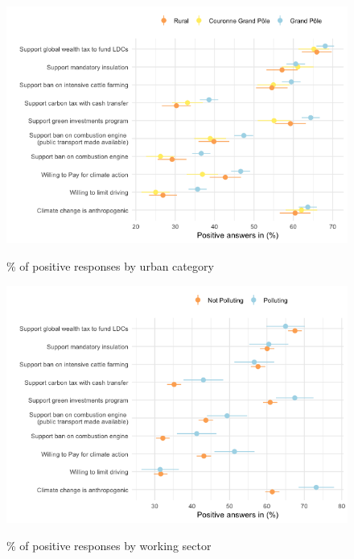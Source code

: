 \begin{framefont}{\small}
\begin{frame}{}%
\begin{figure}[h!]
\caption{\% of positive responses by urban category}
\includegraphics[width=.7\paperwidth]{../figures/FR/positive_all_by_urban_FR.png} \\
\end{figure}
\end{frame}

\begin{frame}{}%
\begin{figure}[h!]
\caption{\% of positive responses by working sector}
\includegraphics[width=.7\paperwidth]{../figures/FR/positive_all_by_polluting_sector_FR.png} \\
\end{figure}
\end{frame}


\end{framefont}
